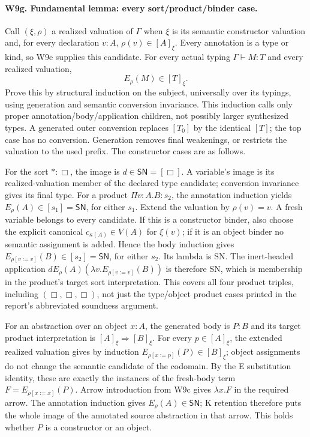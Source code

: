 \paragraph{W9g. Fundamental lemma: every sort/product/binder case.}
Call \((\xi,\rho)\) a realized valuation of \(\Gamma\) when
\(\xi\) is its semantic constructor valuation and, for every
declaration \(v:A\), \(\rho(v)\in[A]_\xi\). Every annotation is
a type or kind, so W9e supplies this candidate. For every actual typing
\(\Gamma\vdash M:T\) and every realized valuation,
\[
                         E_\rho(M)\in[T]_\xi.
\]
Prove this by structural induction on the subject, universally over its
typings, using generation and semantic conversion invariance. This
induction calls only proper annotation/body/application children, not
possibly larger synthesized types. A generated outer conversion replaces
\([T_0]\) by the identical \([T]\); the top case has no conversion.
Generation removes final weakenings, or restricts the valuation to the
used prefix. The constructor cases are as follows.

For the sort \(\ast:\Box\), the image is \(d\in\mathsf{SN}
=[\Box]\). A variable's image is its realized-valuation member of
the declared type candidate; conversion invariance gives its final type.
For a product \(\Pi v:A.B:s_2\), the annotation induction yields
\(E_\rho(A)\in[s_1]=\mathsf{SN}\), for either \(s_1\).
Extend the valuation by \(\rho(v)=v\). A fresh variable belongs to
every candidate. If this is a constructor binder, also choose the explicit
canonical \(c_{\kappa(A)}\in V(A)\) for \(\xi(v)\); if it is an
object binder no semantic assignment is added. Hence the body induction
gives \(E_{\rho[v:=v]}(B)\in[s_2]=\mathsf{SN}\), for either
\(s_2\). Its lambda is SN. The inert-headed application
\(dE_\rho(A)(\lambda v.E_{\rho[v:=v]}(B))\) is therefore SN,
which is membership in the product's target sort interpretation.
This covers all four product triples, including \((\Box,\Box,\Box)\),
not just the type/object product cases printed in the report's abbreviated
soundness argument.

For an abstraction over an object \(x:A\), the generated body is
\(P:B\) and its target product interpretation is
\([A]_\xi\Rightarrow[B]_\xi\). For every \(p\in[A]_\xi\),
the extended realized valuation gives by induction
\(E_{\rho[x:=p]}(P)\in[B]_\xi\); object assignments do not change
the semantic candidate of the codomain. By the E substitution identity,
these are exactly the instances of the fresh-body term
\(F=E_{\rho[x:=x]}(P)\). Arrow introduction from W9c gives
\(\lambda x.F\) in the required arrow. The annotation induction
gives \(E_\rho(A)\in\mathsf{SN}\); K retention therefore puts
the whole image of the annotated source abstraction in that arrow.
This holds whether \(P\) is a constructor or an object.

